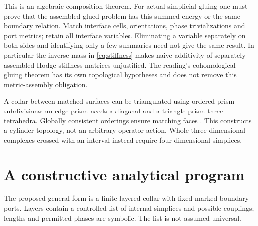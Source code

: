 \documentclass[11pt]{article}
\theoremstyle{definition}
\begin{document}
This is an algebraic composition theorem. For actual simplicial gluing
one must prove that the assembled glued problem has this summed energy
or the same boundary relation. Match interface cells, orientations,
phase trivializations and port metrics; retain all interface variables.
Eliminating a variable separately on both sides and identifying only a
few summaries need not give the same result.
In particular the inverse mass in \eqref{eq:stiffness} makes naive
additivity of separately assembled Hodge stiffness matrices unjustified.
The reading's cohomological gluing theorem has its own topological
hypotheses and does not remove this metric-assembly obligation.

A collar between matched surfaces can be triangulated using ordered
prism subdivisions: an edge prism needs a diagonal and a triangle prism
three tetrahedra. Globally consistent orderings ensure matching faces
\cite{hatcher}. This constructs a cylinder topology, not an arbitrary
operator action. Whole three-dimensional complexes crossed with an
interval instead require four-dimensional simplices.

\section{A constructive analytical program}\label{sec:program}
The proposed general form is a finite layered collar with fixed marked
boundary ports. Layers contain a controlled list of internal simplices
and possible couplings; lengths and permitted phases are symbolic.
The list is not assumed universal.
\end{document}
